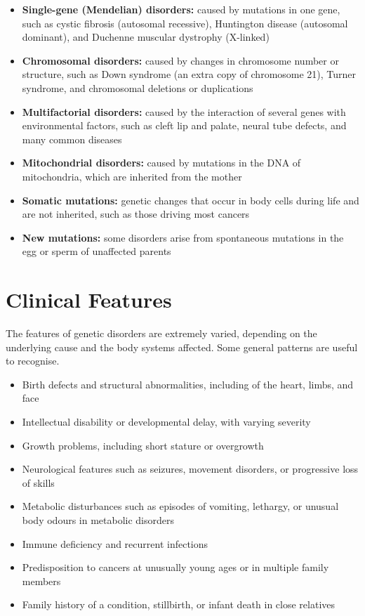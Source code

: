\begin{itemize}
    \item \textbf{Single-gene (Mendelian) disorders:} caused by mutations in one gene, such as cystic fibrosis (autosomal recessive), Huntington disease (autosomal dominant), and Duchenne muscular dystrophy (X-linked)
    \item \textbf{Chromosomal disorders:} caused by changes in chromosome number or structure, such as Down syndrome (an extra copy of chromosome 21), Turner syndrome, and chromosomal deletions or duplications
    \item \textbf{Multifactorial disorders:} caused by the interaction of several genes with environmental factors, such as cleft lip and palate, neural tube defects, and many common diseases
    \item \textbf{Mitochondrial disorders:} caused by mutations in the DNA of mitochondria, which are inherited from the mother
    \item \textbf{Somatic mutations:} genetic changes that occur in body cells during life and are not inherited, such as those driving most cancers
    \item \textbf{New mutations:} some disorders arise from spontaneous mutations in the egg or sperm of unaffected parents
\end{itemize}

\section*{Clinical Features}
The features of genetic disorders are extremely varied, depending on the underlying cause and the body systems affected. Some general patterns are useful to recognise.

\begin{itemize}
    \item Birth defects and structural abnormalities, including of the heart, limbs, and face
    \item Intellectual disability or developmental delay, with varying severity
    \item Growth problems, including short stature or overgrowth
    \item Neurological features such as seizures, movement disorders, or progressive loss of skills
    \item Metabolic disturbances such as episodes of vomiting, lethargy, or unusual body odours in metabolic disorders
    \item Immune deficiency and recurrent infections
    \item Predisposition to cancers at unusually young ages or in multiple family members
    \item Family history of a condition, stillbirth, or infant death in close relatives
\end{itemize}

